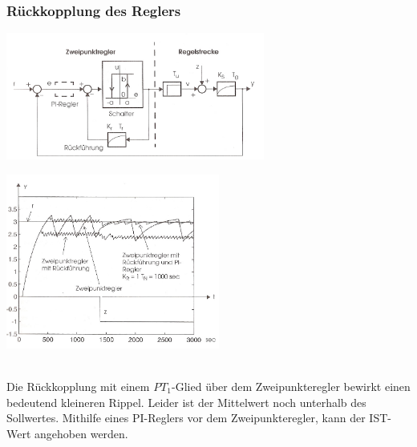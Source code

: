 		\subsubsection{Rückkopplung des Reglers}
		\begin{minipage}{9cm}
		\includegraphics[width=8.5cm]{./bilder/ZweipunktreglerMitRueckfuehrung.jpg}
        \end{minipage}
		\begin{minipage}{7.5cm}
        \includegraphics[width=7cm]{./bilder/ZweipunktreglerMitRueckfuehrung_dia.jpg}
        \end{minipage}\\
		Die Rückkopplung mit einem $PT_1$-Glied über dem Zweipunkteregler bewirkt
		einen bedeutend kleineren Rippel. Leider ist der Mittelwert noch unterhalb des
		Sollwertes. Mithilfe eines PI-Reglers vor dem Zweipunkteregler, kann der IST-Wert
		angehoben werden.
	
